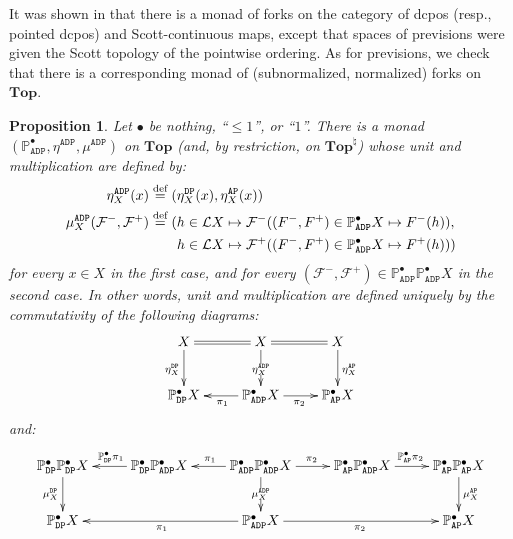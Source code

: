 \documentclass[preprint,12pt]{elsarticle}
\newcommand\eqdef{\mathrel{\buildrel \text{def}\over=}}
\newcommand\Lform{\mathcal L}
\newcommand\Pred{\mathbb{P}}
\newcommand\Angel{{\mathtt{A}}}
\newcommand\Demon{{\mathtt{D}}}
\newcommand\Nature{{\mathtt{P}}}
\newcommand\AN{{\Angel\Nature}}
\newcommand\DN{{\Demon\Nature}}
\newcommand\ADN{{\Angel\Demon\Nature}}
\newcommand\Topcat{\mathbf{Top}}
\newtheorem{proposition}[theorem]{Proposition}
\begin{document}
It was shown in \cite[Proposition~3]{Gou-csl07} that there is a monad
of forks on the category of dcpos (resp., pointed dcpos) and
Scott-continuous maps, except that spaces of previsions were given the
Scott topology of the pointwise ordering.  As for previsions, we check
that there is a corresponding monad of (subnormalized, normalized)
forks on $\Topcat$.
\begin{proposition}
  \label{prop:fork:monad}
  Let $\bullet$ be nothing, ``$\leq 1$'', or ``$1$''.  There is a
  monad
  $(\Pred_\ADN^\bullet, \allowbreak \eta^\ADN, \allowbreak \mu^\ADN)$
  on $\Topcat$ (and, by restriction, on $\Topcat^\natural$) whose unit
  and multiplication are defined by:
  \begin{align*}
    \eta^\ADN_X (x)
    & \eqdef (\eta^\DN_X (x), \eta^\AN_X (x)) \\
    \mu^\ADN_X (\mathcal F^-, \mathcal F^+)
    & \eqdef (h \in \Lform X \mapsto \mathcal F^- ((F^-, F^+) \in
      \Pred_\ADN^\bullet X \mapsto F^- (h)), \\
      & \qquad
        h \in \Lform X \mapsto \mathcal F^+ ((F^-, F^+) \in
        \Pred_\ADN^\bullet X \mapsto F^+ (h)))
  \end{align*}
  for every $x \in X$ in the first case, and for every
  $(\mathcal F^-, \mathcal F^+) \in \Pred_\ADN^\bullet
  {\Pred_\ADN^\bullet X}$ in the second case.  In other words, unit
  and multiplication are defined uniquely by the commutativity of the
  following diagrams:
  \begin{equation}
    \label{eq:etaADN}
    \xymatrix{
      X
      \ar[d]_{\eta^\DN_X}
      &
      X
      \ar@{=}[r]
      \ar[d]|{\eta^\ADN_X}
      \ar@{=}[l]
      &
      X
      \ar[d]^{\eta^\AN_X}
      \\
      \Pred_\DN^\bullet X
      &
      \Pred_\ADN^\bullet X
      \ar[l]^{\pi_1}
      \ar[r]_{\pi_2}
      &
      \Pred_\AN^\bullet X
    }
  \end{equation}
  and:
  \begin{equation}
    \label{eq:muADN}
    \xymatrix{
      \Pred_\DN^\bullet {\Pred_\DN^\bullet X}
      \ar[d]_{\mu^\DN_X}
      &
      \Pred_\DN^\bullet {\Pred_\ADN^\bullet X}
      \ar[l]_{\Pred_\DN^\bullet {\pi_1}}
      &
      \Pred_\ADN^\bullet {\Pred_\ADN^\bullet X}
      \ar[l]_{\pi_1}
      \ar[d]|{\mu^\ADN_X}
      \ar[r]^{\pi_2}
      &
      \Pred_\AN^\bullet {\Pred_\ADN^\bullet X}
      \ar[r]^{\Pred_\AN^\bullet {\pi_2}}
      &
      \Pred_\AN^\bullet {\Pred_\AN^\bullet X}
      \ar[d]^{\mu^\AN_X}
      \\
      \Pred_\DN^\bullet X
      &
      &
      \Pred_\ADN^\bullet X
      \ar[ll]^{\pi_1}
      \ar[rr]_{\pi_2}
      &
      &
      \Pred_\AN^\bullet X
    }
  \end{equation}
\end{proposition}
\end{document}
